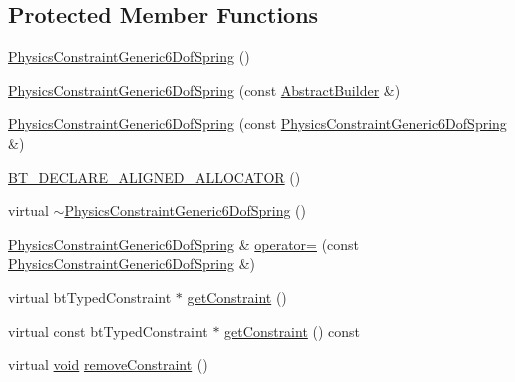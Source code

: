 \subsection*{Protected Member Functions}
\begin{DoxyCompactItemize}
\item 
\mbox{\hyperlink{classnjli_1_1_physics_constraint_generic6_dof_spring_a3477772fafe8745a8963235b7eddad65}{Physics\+Constraint\+Generic6\+Dof\+Spring}} ()
\item 
\mbox{\hyperlink{classnjli_1_1_physics_constraint_generic6_dof_spring_a9debc78b7868e3d1af4a5e3876f50a19}{Physics\+Constraint\+Generic6\+Dof\+Spring}} (const \mbox{\hyperlink{classnjli_1_1_abstract_builder}{Abstract\+Builder}} \&)
\item 
\mbox{\hyperlink{classnjli_1_1_physics_constraint_generic6_dof_spring_a7520f002b92a424ddb5fd19e52c7a47e}{Physics\+Constraint\+Generic6\+Dof\+Spring}} (const \mbox{\hyperlink{classnjli_1_1_physics_constraint_generic6_dof_spring}{Physics\+Constraint\+Generic6\+Dof\+Spring}} \&)
\item 
\mbox{\hyperlink{classnjli_1_1_physics_constraint_generic6_dof_spring_a916ae50f81fd16538e0700f883a84302}{B\+T\+\_\+\+D\+E\+C\+L\+A\+R\+E\+\_\+\+A\+L\+I\+G\+N\+E\+D\+\_\+\+A\+L\+L\+O\+C\+A\+T\+OR}} ()
\item 
virtual \mbox{\hyperlink{classnjli_1_1_physics_constraint_generic6_dof_spring_a80a7d57ae9374e5a5a6795d59a9b53ab}{$\sim$\+Physics\+Constraint\+Generic6\+Dof\+Spring}} ()
\item 
\mbox{\hyperlink{classnjli_1_1_physics_constraint_generic6_dof_spring}{Physics\+Constraint\+Generic6\+Dof\+Spring}} \& \mbox{\hyperlink{classnjli_1_1_physics_constraint_generic6_dof_spring_a213a2c40144478db8dbb877c6539dcb0}{operator=}} (const \mbox{\hyperlink{classnjli_1_1_physics_constraint_generic6_dof_spring}{Physics\+Constraint\+Generic6\+Dof\+Spring}} \&)
\item 
virtual bt\+Typed\+Constraint $\ast$ \mbox{\hyperlink{classnjli_1_1_physics_constraint_generic6_dof_spring_aa90bf42f88d0314d834a6b3d670ba90d}{get\+Constraint}} ()
\item 
virtual const bt\+Typed\+Constraint $\ast$ \mbox{\hyperlink{classnjli_1_1_physics_constraint_generic6_dof_spring_a072c17a336b74f574c9892e8ccf12278}{get\+Constraint}} () const
\item 
virtual \mbox{\hyperlink{_thread_8h_af1e856da2e658414cb2456cb6f7ebc66}{void}} \mbox{\hyperlink{classnjli_1_1_physics_constraint_generic6_dof_spring_ad8d9013c4e17710207f13cf40d667cd1}{remove\+Constraint}} ()
\end{DoxyCompactItemize}
